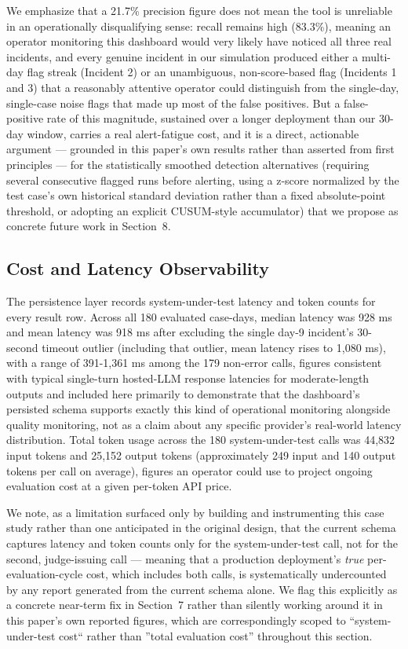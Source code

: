 \documentclass[11pt,a4paper]{article}
\begin{document}
We emphasize that a 21.7\% precision figure does not mean the tool is
unreliable in an operationally disqualifying sense: recall remains high
(83.3\%), meaning an operator monitoring this dashboard would very
likely have noticed all three real incidents, and every genuine incident
in our simulation produced either a multi-day flag streak (Incident 2)
or an unambiguous, non-score-based flag (Incidents 1 and 3) that a
reasonably attentive operator could distinguish from the single-day,
single-case noise flags that made up most of the false positives. But a
false-positive rate of this magnitude, sustained over a longer
deployment than our 30-day window, carries a real alert-fatigue cost,
and it is a direct, actionable argument --- grounded in this
paper's own results rather than asserted from first
principles --- for the statistically smoothed detection alternatives
(requiring several consecutive flagged runs before alerting, using a
z-score normalized by the test case's own historical
standard deviation rather than a fixed absolute-point threshold, or
adopting an explicit CUSUM-style accumulator) that we propose as
concrete future work in Section~8.

\subsection{Cost and Latency Observability}

The persistence layer records system-under-test latency and token counts
for every result row. Across all 180 evaluated case-days, median latency
was 928 ms and mean latency was 918 ms after excluding the single day-9
incident's 30-second timeout outlier (including that
outlier, mean latency rises to 1,080 ms), with a range of 391-1,361 ms
among the 179 non-error calls, figures consistent with typical
single-turn hosted-LLM response latencies for moderate-length outputs
and included here primarily to demonstrate that the
dashboard's persisted schema supports exactly this kind
of operational monitoring alongside quality monitoring, not as a claim
about any specific provider's real-world latency
distribution. Total token usage across the 180 system-under-test calls
was 44,832 input tokens and 25,152 output tokens (approximately 249
input and 140 output tokens per call on average), figures an operator
could use to project ongoing evaluation cost at a given per-token API
price.

We note, as a limitation surfaced only by building and instrumenting
this case study rather than one anticipated in the original design, that
the current schema captures latency and token counts only for the
system-under-test call, not for the second, judge-issuing call ---
meaning that a production deployment's \emph{true}
per-evaluation-cycle cost, which includes both calls, is systematically
undercounted by any report generated from the current schema alone. We
flag this explicitly as a concrete near-term fix in Section~7 rather
than silently working around it in this paper's own
reported figures, which are correspondingly scoped to ``system-under-test
cost`` rather than ''total evaluation cost'' throughout this section.
\end{document}
